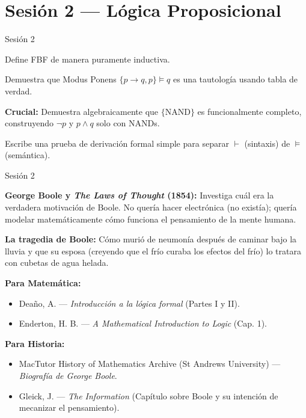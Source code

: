 \documentclass[11pt, letterpaper]{article}
\begin{document}
\newpage

\section{Sesi\'on 2 --- L\'ogica Proposicional}

\begin{verificacion}{Sesi\'on 2}
\begin{checklist}
  \item Define FBF de manera puramente inductiva.
  \item Demuestra que Modus Ponens $\{p\to q, p\} \models q$ es una tautolog\'ia usando tabla de verdad.
  \item \textbf{Crucial:} Demuestra algebraicamente que $\{\text{NAND}\}$ es funcionalmente completo, construyendo $\neg p$ y $p\land q$ solo con NANDs.
  \item Escribe una prueba de derivaci\'on formal simple para separar $\vdash$ (sintaxis) de $\models$ (sem\'antica).
\end{checklist}
\end{verificacion}

\begin{historia}{Sesi\'on 2}
\begin{checklist}
  \item \textbf{George Boole y \textit{The Laws of Thought} (1854):} Investiga cu\'al era la verdadera motivaci\'on de Boole. No quer\'ia hacer electr\'onica (no exist\'ia); quer\'ia modelar matem\'aticamente c\'omo funciona el pensamiento de la mente humana.
  \item \textbf{La tragedia de Boole:} C\'omo muri\'o de neumon\'ia despu\'es de caminar bajo la lluvia y que su esposa (creyendo que el fr\'io curaba los efectos del fr\'io) lo tratara con cubetas de agua helada.
\end{checklist}
\end{historia}

\begin{referencias}
\textbf{Para Matem\'atica:}
\begin{itemize}
    \item Deaño, A. --- \textit{Introducci\'on a la l\'ogica formal} (Partes I y II).
    \item Enderton, H. B. --- \textit{A Mathematical Introduction to Logic} (Cap. 1).
\end{itemize}
\textbf{Para Historia:}
\begin{itemize}
    \item MacTutor History of Mathematics Archive (St Andrews University) --- \textit{Biograf\'ia de George Boole}.
    \item Gleick, J. --- \textit{The Information} (Cap\'itulo sobre Boole y su intenci\'on de mecanizar el pensamiento).
\end{itemize}
\end{referencias}
\end{document}
